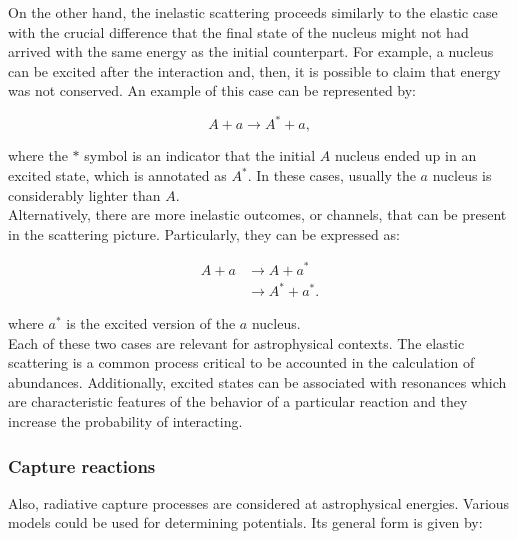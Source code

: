 \documentclass[openany]{book}
\begin{document}
On the other hand, the inelastic scattering proceeds similarly to the elastic case with the crucial difference that the final state of the nucleus might not had arrived with the same energy as the initial counterpart. For example, a nucleus can be excited after the interaction and, then, it is possible to claim that energy was not conserved. An example of this case can be represented by:

\begin{equation}  \label{eq:nuclearReaction_scattering_inelastic}
	A + a \rightarrow A^{*} + a,
\end{equation}

where the $*$ symbol is an indicator that the initial $A$ nucleus ended up in an excited state, which is annotated as $A^{*}$. In these cases, usually the $a$ nucleus is considerably lighter than $A$.\\ 

Alternatively, there are more inelastic outcomes, or channels, that can be present in the scattering picture. Particularly, they can be expressed as: 

\begin{equation}  \label{eq:nuclearReaction_scattering_inelastic2}
	\begin{split}
	A + a 	&\rightarrow A + a^{*} \\
				&\rightarrow A^{*} + a^{*}.
\end{split}
\end{equation}

where $a^{*}$ is the excited version of the $a$ nucleus. \\

Each of these two cases are relevant for astrophysical contexts. The elastic scattering is a common process critical to be accounted in the calculation of abundances. Additionally, excited states can be associated with resonances which are characteristic features of the behavior of a particular reaction and they increase the probability of interacting. \\

\subsubsection{Capture reactions} \label{ssub:captureReactions}

Also, radiative capture processes are considered at astrophysical energies. Various models could be used for determining potentials. Its general form is given by:
\end{document}
